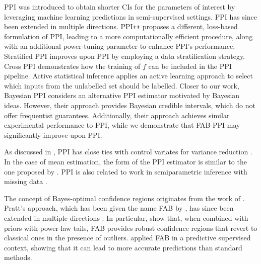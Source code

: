 PPI \citep{Angelopoulos2023} was introduced to obtain shorter CIs for the parameters of interest by leveraging machine learning predictions in semi-supervised settings. PPI has since been extended in multiple directions. PPI\texttt{++} \citep{Angelopoulos2023a} proposes a different, loss-based formulation of PPI, leading to a more computationally efficient procedure, along with an additional power-tuning parameter to enhance PPI's performance. Stratified PPI \citep{Fisch2024} improves upon PPI by employing a data stratification strategy. Cross PPI \citep{Zrnic2024a} demonstrates how the training of $f$ can be included in the PPI pipeline. Active statistical inference \citep{Zrnic2024} applies an active learning approach to select which inputs from the unlabelled set should be labelled. Closer to our work, Bayesian PPI \citep{Hofer2024} considers an alternative PPI estimator motivated by Bayesian ideas. However, their approach provides Bayesian credible intervals, which do not offer frequentist guarantees. Additionally, their approach achieves similar experimental performance to PPI, while we demonstrate that FAB-PPI may significantly improve upon PPI. 

As discussed in \citet{Angelopoulos2023,Angelopoulos2023a}, PPI has close ties with control variates for variance reduction \citep[\S4.1]{Glasserman2003}. In the case of mean estimation, the form of the PPI estimator is similar to the one proposed by \citet{Zhang2019}. PPI is also related to work in semiparametric inference with missing data \citep{Robins1995}.

The concept of Bayes-optimal confidence regions originates from the work of \citet{Pratt1961,Pratt1963}. Pratt's approach, which has been given the name FAB by \citet{Yu2018}, has since been extended in multiple directions \citep{Brown1995,Farchione2008,Kabaila2013,Kabaila2022,Yu2018,Hoff2019,Hoff2023}. In particular, \citet{Cortinovis2024} show that, when combined with priors with power-law tails, FAB provides robust confidence regions that revert to classical ones in the presence of outliers. \citet{Hoff2023} applied FAB in a predictive supervised context, showing that it can lead to more accurate predictions than standard methods.
